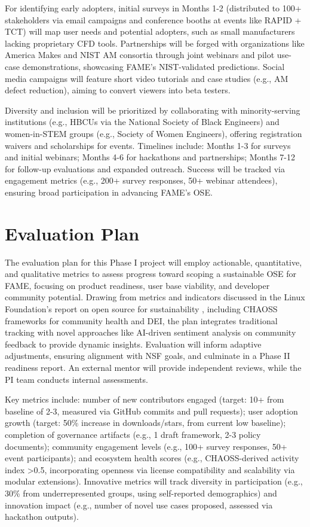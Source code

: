 \documentclass[11pt]{article}
\begin{document}
For identifying early adopters, initial surveys in Months 1-2 (distributed to 100+ stakeholders via email campaigns and conference booths at events like RAPID + TCT) will map user needs and potential adopters, such as small manufacturers lacking proprietary CFD tools. Partnerships will be forged with organizations like America Makes and NIST AM consortia through joint webinars and pilot use-case demonstrations, showcasing FAME's NIST-validated predictions. Social media campaigns will feature short video tutorials and case studies (e.g., AM defect reduction), aiming to convert viewers into beta testers.

Diversity and inclusion will be prioritized by collaborating with minority-serving institutions (e.g., HBCUs via the National Society of Black Engineers) and women-in-STEM groups (e.g., Society of Women Engineers), offering registration waivers and scholarships for events. Timelines include: Months 1-3 for surveys and initial webinars; Months 4-6 for hackathons and partnerships; Months 7-12 for follow-up evaluations and expanded outreach. Success will be tracked via engagement metrics (e.g., 200+ survey responses, 50+ webinar attendees), ensuring broad participation in advancing FAME's OSE.
\vspace{-3pt}

\section*{Evaluation Plan}
\vspace{-3pt}
\noindent
The evaluation plan for this Phase I project will employ actionable, quantitative, and qualitative metrics to assess progress toward scoping a sustainable OSE for FAME, focusing on product readiness, user base viability, and developer community potential. Drawing from metrics and indicators discussed in the Linux Foundation's report on open source for sustainability \cite{Sandberg2023}, including CHAOSS frameworks for community health and DEI, the plan integrates traditional tracking with novel approaches like AI-driven sentiment analysis on community feedback to provide dynamic insights. Evaluation will inform adaptive adjustments, ensuring alignment with NSF goals, and culminate in a Phase II readiness report. An external mentor will provide independent reviews, while the PI team conducts internal assessments.

Key metrics include: number of new contributors engaged (target: 10+ from baseline of 2-3, measured via GitHub commits and pull requests); user adoption growth (target: 50\% increase in downloads/stars, from current low baseline); completion of governance artifacts (e.g., 1 draft framework, 2-3 policy documents); community engagement levels (e.g., 100+ survey responses, 50+ event participants); and ecosystem health scores (e.g., CHAOSS-derived activity index >0.5, incorporating openness via license compatibility and scalability via modular extensions). Innovative metrics will track diversity in participation (e.g., 30\% from underrepresented groups, using self-reported demographics) and innovation impact (e.g., number of novel use cases proposed, assessed via hackathon outputs).
\end{document}
